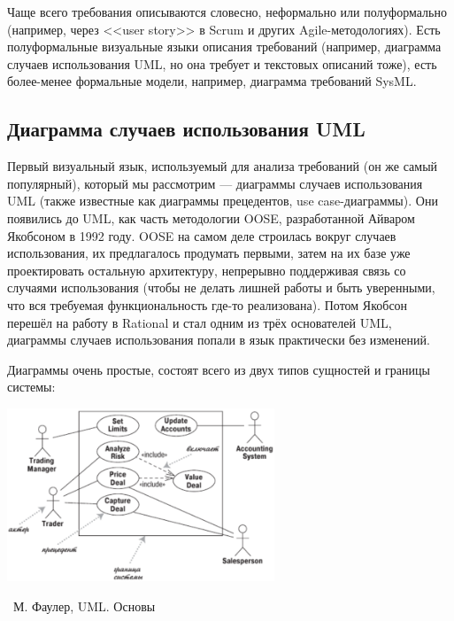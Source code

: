 \documentclass[a5paper]{article}
\newcommand{\attribution}[1] {
    \vspace{-4mm}\begin{flushright}\begin{scriptsize}%
    {\textcopyright\, #1}\end{scriptsize}\end{flushright}
}
\begin{document}
Чаще всего требования описываются словесно, неформально или полуформально (например, через <<user story>> в Scrum и других Agile-методологиях). Есть полуформальные визуальные языки описания требований (например, диаграмма случаев использования UML, но она требует и текстовых описаний тоже), есть более-менее формальные модели, например, диаграмма требований SysML.

\subsection{Диаграмма случаев использования UML}

Первый визуальный язык, используемый для анализа требований (он же самый популярный), который мы рассмотрим --- диаграммы случаев использования UML (также известные как диаграммы прецедентов, use case-диаграммы). Они появились до UML, как часть методологии OOSE, разработанной Айваром Якобсоном в 1992 году. OOSE на самом деле строилась вокруг случаев использования, их предлагалось продумать первыми, затем на их базе уже проектировать остальную архитектуру, непрерывно поддерживая связь со случаями использования (чтобы не делать лишней работы и быть уверенными, что вся требуемая функциональность где-то реализована). Потом Якобсон перешёл на работу в Rational и стал одним из трёх основателей UML, диаграммы случаев использования попали в язык практически без изменений.

Диаграммы очень простые, состоят всего из двух типов сущностей и границы системы:

\begin{center}
    \includegraphics[width=0.6\textwidth]{useCaseDiagram.png}
    \attribution{М. Фаулер, UML. Основы}
\end{center}
\end{document}
